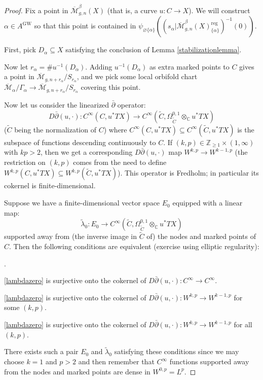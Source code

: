 \documentclass[12pt]{article}
\theoremstyle{definition}
\theoremstyle{remark}
\numberwithin{equation}{subsection}
\newcommand{\CC}{\mathbb C}
\newcommand{\ZZ}{\mathbb Z}
\newcommand{\Mbar}{\overline{\mathcal M}}
\newcommand{\delbar}{\bar\partial}
\newcommand{\GW}{\mathrm{GW}}
\newcommand{\reg}{\mathrm{reg}}
\newcounter{rcounti}
\newenvironment{rlist}{\begin{list}{\roman{rcounti}.}{\usecounter{rcounti}
\setlength\itemsep{0pt}
\setlength\labelsep{4pt}
\setlength\labelwidth{16pt}
\setlength\leftmargin{32pt}
\setlength\listparindent{0pt}
\setlength\parsep{0pt}
\setlength\parskip{0pt}
\setlength\partopsep{0pt}
\setlength\rightmargin{0pt}
\setlength\topsep{0pt}
\setlength\itemindent{0pt}
}}{\end{list}}
\begin{document}
\begin{proof}
Fix a point in $\Mbar_{g,n}^\beta(X)$ (that is, a curve $u:C\to X$).  We will construct $\alpha\in A^\GW$ so that this point is contained in $\psi_{\varnothing\{\alpha\}}((s_\alpha|\Mbar_{g,n}^\beta(X)_{\{\alpha\}}^\reg)^{-1}(0))$.

First, pick $D_\alpha\subseteq X$ satisfying the conclusion of Lemma \ref{stabilizationlemma}.

Now let $r_\alpha=\#u^{-1}(D_\alpha)$.  Adding $u^{-1}(D_\alpha)$ as extra marked points to $C$ gives a point in $\Mbar_{g,n+r_\alpha}/S_{r_\alpha}$, and we pick some local orbifold chart $\Mbar_\alpha/\Gamma_\alpha\to\Mbar_{g,n+r_\alpha}/S_{r_\alpha}$ covering this point.

Now let us consider the linearized $\delbar$ operator:
\begin{equation}\label{linearizeddelbarforthickening}
D\delbar(u,\cdot):C^\infty(C,u^\ast TX)\to C^\infty(\tilde C,\Omega^{0,1}_{\tilde C}\otimes_\CC u^\ast TX)
\end{equation}
($\tilde C$ being the normalization of $C$) where $C^\infty(C,u^\ast TX)\subseteq C^\infty(\tilde C,u^\ast TX)$ is the subspace of functions descending continuously to $C$.  If $(k,p)\in\ZZ_{\geq 1}\times(1,\infty)$ with $kp>2$, then we get a corresponding $D\delbar(u,\cdot)$ map $W^{k,p}\to W^{k-1,p}$ (the restriction on $(k,p)$ comes from the need to define $W^{k,p}(C,u^\ast TX)\subseteq W^{k,p}(\tilde C,u^\ast TX)$).  This operator is Fredholm; in particular its cokernel is finite-dimensional.

Suppose we have a finite-dimensional vector space $E_0$ equipped with a linear map:
\begin{equation}\label{lambdazero}
\tilde\lambda_0:E_0\to C^\infty(\tilde C,\Omega^{0,1}_{\tilde C}\otimes_\CC u^\ast TX)
\end{equation}
supported away from (the inverse image in $\tilde C$ of) the nodes and marked points of $C$.  Then the following conditions are equivalent (exercise using elliptic regularity):
\begin{rlist}
\item\eqref{lambdazero} is surjective onto the cokernel of $D\delbar(u,\cdot):C^\infty\to C^\infty$.
\item\eqref{lambdazero} is surjective onto the cokernel of $D\delbar(u,\cdot):W^{k,p}\to W^{k-1,p}$ for some $(k,p)$.
\item\eqref{lambdazero} is surjective onto the cokernel of $D\delbar(u,\cdot):W^{k,p}\to W^{k-1,p}$ for all $(k,p)$.
\end{rlist}
There exists such a pair $E_0$ and $\tilde\lambda_0$ satisfying these conditions since we may choose $k=1$ and $p>2$ and then remember that $C^\infty$ functions supported away from the nodes and marked points are dense in $W^{0,p}=L^p$.


\end{proof}
\end{document}
